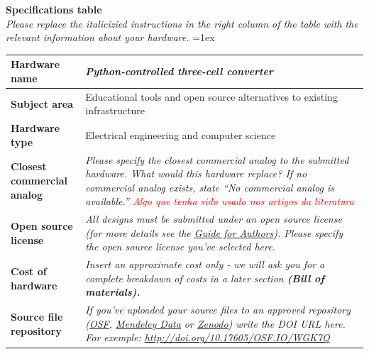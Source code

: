 \documentclass[11pt, letterpaper]{article}
\begin{document}
\begin{flushleft}
\newpage
\textbf{Specifications table}\\
\textit{Please replace the italicizied instructions in the right column of the table with the relevant information about your hardware.}
\vskip 0.2cm
\tabulinesep=1ex
\begin{tabu} to \linewidth {|X|X[3,l]|}
\hline  \textbf{Hardware name} & \textit{Python-controlled three-cell converter}
  \\
  \hline \textbf{Subject area} & %
  Educational tools and open source alternatives to existing infrastructure
  \\
  \hline \textbf{Hardware type} &
Electrical engineering and computer science
  \\ 
\hline \textbf{Closest commercial analog} &
  \textit{Please specify the closest commercial analog to the submitted hardware. What would this hardware replace? If no commercial analog exists, state “No commercial analog is available.” \textcolor{red}{Algo que tenha sido usado nos artigos da literatura}}
  \\
\hline \textbf{Open source license} &
  {\it All designs must be submitted under an open source license (for more details see the \href{https://www.elsevier.com/journals/hardwarex/2468-0672/guide-for-authors}{\underline{Guide for Authors}}). Please specify the open source license you’ve selected here. }
  \\
\hline \textbf{Cost of hardware} &
  \textit{Insert an approximate cost only - we will ask you for a complete breakdown of costs in a later section \textbf{(Bill of materials).}}
  \\
\hline \textbf{Source file repository} & 
  \textit{If you’ve uploaded your source files to an approved repository (\href{http://osf.io}{\underline{OSF}}, \href{https://data.mendeley.com/}{\underline{Mendeley Data}} or \href{https://zenodo.org/}{\underline{Zenodo}}) write the DOI URL here. For exemple:  \href{http://doi.org/10.17605/OSF.IO/WGK7Q}{http://doi.org/10.17605/OSF.IO/WGK7Q}}  

\end{tabu}
\end{flushleft}
\end{document}

